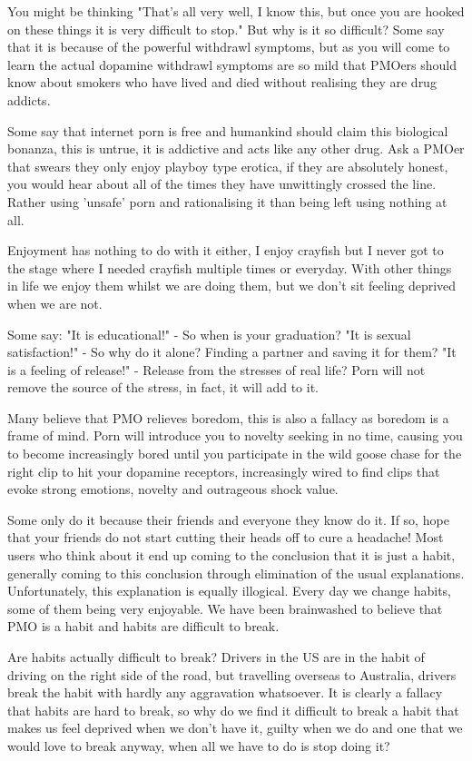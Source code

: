 You might be thinking "That's all very well, I know this, but once you are hooked on these things it is very difficult to stop." But why is it so difficult? Some say that it is because of the powerful withdrawl symptoms, but as you will come to learn the actual dopamine withdrawl symptoms are so mild that PMOers should know about smokers who have lived and died without realising they are drug addicts.

Some say that internet porn is free and humankind should claim this biological bonanza, this is untrue, it is addictive and acts like any other drug. Ask a PMOer that swears they only enjoy playboy type erotica, if they are absolutely honest, you would hear about all of the times they have unwittingly crossed the line. Rather using 'unsafe' porn and rationalising it than being left using nothing at all.

Enjoyment has nothing to do with it either, I enjoy crayfish but I never got to the stage where I needed crayfish multiple times or everyday. With other things in life we enjoy them whilst we are doing them, but we don't sit feeling deprived when we are not.

Some say:
  "It is educational!" - So when is your graduation?
  "It is sexual satisfaction!" - So why do it alone? Finding a partner and saving it for them?
  "It is a feeling of release!" - Release from the stresses of real life? Porn will not remove the source of the stress, in fact, it will add to it.

Many believe that PMO relieves boredom, this is also a fallacy as boredom is a frame of mind. Porn will introduce you to novelty seeking in no time, causing you to become increasingly bored until you participate in the wild goose chase for the right clip to hit your dopamine receptors, increasingly wired to find clips that evoke strong emotions, novelty and outrageous shock value.

Some only do it because their friends and everyone they know do it. If so, hope that your friends do not start cutting their heads off to cure a headache! Most users who think about it end up coming to the conclusion that it is just a habit, generally coming to this conclusion through elimination of the usual explanations. Unfortunately, this explanation is equally illogical. Every day we change habits, some of them being very enjoyable. We have been brainwashed to believe that PMO is a habit and habits are difficult to break.

Are habits actually difficult to break? Drivers in the US are in the habit of driving on the right side of the road, but travelling overseas to Australia, drivers break the habit with hardly any aggravation whatsoever. It is clearly a fallacy that habits are hard to break, so why do we find it difficult to break a habit that makes us feel deprived when we don't have it, guilty when we do and one that we would love to break anyway, when all we have to do is stop doing it?

